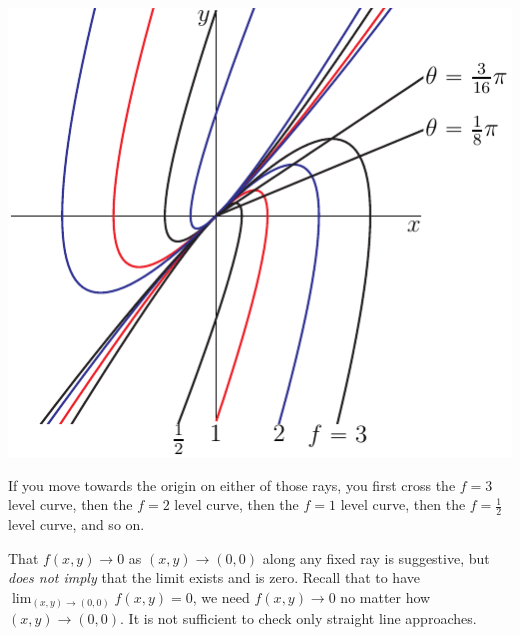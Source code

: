 \begin{eg}
{\begin{efig}
\begin{center}
   \includegraphics[scale=0.8]{noLimA.pdf}
\end{center}
\end{efig}
}
If you move towards the origin on either of those rays, you first cross 
the $f=3$ level curve, then the $f=2$ level curve, then the $f=1$ level curve, then the $f=\frac{1}{2}$ level curve, and so on.


That $f(x,y)\rightarrow 0$ as $(x,y)\rightarrow (0,0)$ along any fixed ray
is suggestive, but \emph{does not imply} that the limit exists and is zero.
Recall that to have $\lim_{(x,y)\rightarrow(0,0)}f(x,y)=0$,
we need $f(x,y)\rightarrow 0$ no matter how $(x,y)\rightarrow (0,0)$.
It is not sufficient to check only straight line approaches.



\end{eg}
